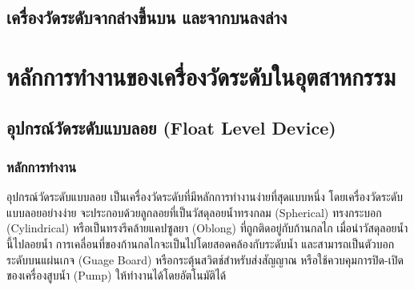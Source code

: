 \documentclass[final,11pt]{article}
\begin{document}
\subsection{เครื่องวัดระดับจากล่างขึ้นบน และจากบนลงล่าง}

\newpage
\section{หลักการทำงานของเครื่องวัดระดับในอุตสาหกรรม}
\subsection{อุปกรณ์วัดระดับแบบลอย (Float Level Device)}
\subsubsection{หลักการทำงาน} 
อุปกรณ์วัดระดับแบบลอย เป็นเครื่องวัดระดับที่มีหลักการทำงานง่ายที่สุดแบบหนึ่ง
โดยเครื่องวัดระดับแบบลอยอย่างง่าย จะประกอบด้วยลูกลอยที่เป็นวัสดุลอยน้ำทรงกลม (Spherical) ทรงกระบอก (Cylindrical)
หรือเป็นทรงรีคล้ายแคปซูลยา (Oblong) ที่ถูกติดอยู่กับก้านกลไก เมื่อนำวัสดุลอยน้ำนี้ไปลอยน้ำ การเคลื่อนที่ของก้านกลไกจะเป็นไปโดยสอดคล้องกับระดับน้ำ
และสามารถเป็นตัวบอกระดับบนแผ่นเกจ (Guage Board) หรือกระตุ้นสวิตช์สำหรับส่งสัญญาณ หรือใช้ควบคุมการปิด-เปิดของเครื่องสูบน้ำ (Pump) ให้ทำงานได้โดยอัตโนมัติได้  
\end{document}
